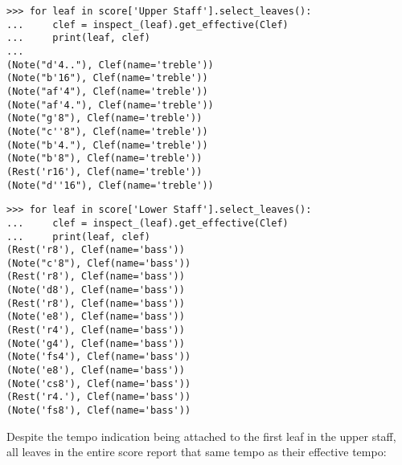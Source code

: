 \begin{abjadbookoutput}
\begin{singlespacing}
\vspace{-0.5\baselineskip}
\begin{verbatim}
>>> for leaf in score['Upper Staff'].select_leaves():
...     clef = inspect_(leaf).get_effective(Clef)
...     print(leaf, clef)
...
(Note("d'4.."), Clef(name='treble'))
(Note("b'16"), Clef(name='treble'))
(Note("af'4"), Clef(name='treble'))
(Note("af'4."), Clef(name='treble'))
(Note("g'8"), Clef(name='treble'))
(Note("c''8"), Clef(name='treble'))
(Note("b'4."), Clef(name='treble'))
(Note("b'8"), Clef(name='treble'))
(Rest('r16'), Clef(name='treble'))
(Note("d''16"), Clef(name='treble'))
\end{verbatim}
\begin{verbatim}
>>> for leaf in score['Lower Staff'].select_leaves():
...     clef = inspect_(leaf).get_effective(Clef)
...     print(leaf, clef)
(Rest('r8'), Clef(name='bass'))
(Note("c'8"), Clef(name='bass'))
(Rest('r8'), Clef(name='bass'))
(Note('d8'), Clef(name='bass'))
(Rest('r8'), Clef(name='bass'))
(Note('e8'), Clef(name='bass'))
(Rest('r4'), Clef(name='bass'))
(Note('g4'), Clef(name='bass'))
(Note('fs4'), Clef(name='bass'))
(Note('e8'), Clef(name='bass'))
(Note('cs8'), Clef(name='bass'))
(Rest('r4.'), Clef(name='bass'))
(Note('fs8'), Clef(name='bass'))
\end{verbatim}
\end{singlespacing}
\end{abjadbookoutput}

\noindent Despite the tempo indication being attached to the first leaf in the
upper staff, all leaves in the entire score report that same tempo as their
effective tempo:

\begin{comment}
<abjad>
for leaf in score['Upper Staff'].select_leaves():
    tempo = inspect_(leaf).get_effective(Tempo)
    print(leaf, tempo)

for leaf in score['Lower Staff'].select_leaves():
    tempo = inspect_(leaf).get_effective(Tempo)
    print(leaf, tempo)

</abjad>
\end{comment}

